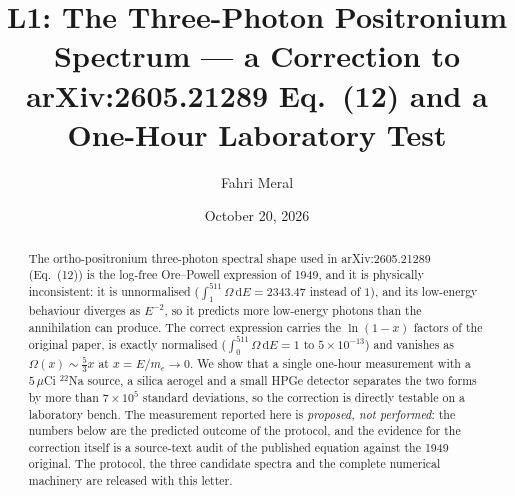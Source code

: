\documentclass[11pt,a4paper]{article}
\title{\textbf{L1: The Three-Photon Positronium Spectrum --- a Correction to arXiv:2605.21289 Eq.~(12) and a One-Hour Laboratory Test}}
\author{Fahri Meral}
\date{October 20, 2026}
\begin{document}
\maketitle

\begin{abstract}
The ortho-positronium three-photon spectral shape used in
arXiv:2605.21289 (Eq.~(12)) is the log-free Ore--Powell expression of
1949, and it is physically inconsistent: it is unnormalised
($\int_1^{511}\Omega\,\mathrm{d}E = 2343.47$ instead of $1$), and its
low-energy behaviour diverges as $E^{-2}$, so it predicts more
low-energy photons than the annihilation can produce. The correct
expression carries the $\ln(1-x)$ factors of the original paper,
is exactly normalised ($\int_0^{511}\Omega\,\mathrm{d}E = 1$ to
$5\times 10^{-13}$) and vanishes as $\Omega(x)\sim\tfrac{5}{3}x$ at
$x=E/m_e\to 0$. We show that a single one-hour measurement with a
$5\,\mu$Ci $^{22}$Na source, a silica aerogel and a small HPGe
detector separates the two forms by more than $7\times 10^{5}$
standard deviations, so the correction is directly testable on a
laboratory bench. The measurement reported here is \emph{proposed, not
performed}: the numbers below are the predicted outcome of the
protocol, and the evidence for the correction itself is a source-text
audit of the published equation against the 1949 original. The
protocol, the three candidate spectra and the complete numerical
machinery are released with this letter.
\end{abstract}
\end{document}
